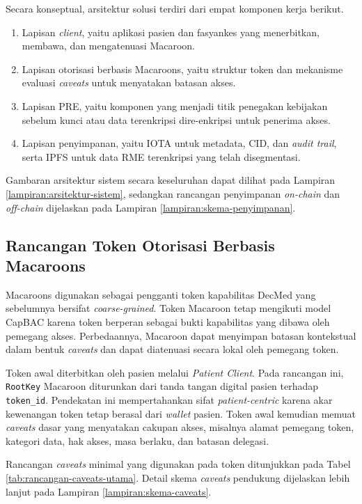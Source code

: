 Secara konseptual, arsitektur solusi terdiri dari empat komponen kerja berikut.

\begin{enumerate}[leftmargin=*]
	\item Lapisan \textit{client}, yaitu aplikasi pasien dan fasyankes yang menerbitkan, membawa, dan mengatenuasi Macaroon.
	\item Lapisan otorisasi berbasis Macaroons, yaitu struktur token dan mekanisme evaluasi \textit{caveats} untuk menyatakan batasan akses.
	\item Lapisan PRE, yaitu komponen yang menjadi titik penegakan kebijakan sebelum kunci atau data terenkripsi dire-enkripsi untuk penerima akses.
	\item Lapisan penyimpanan, yaitu IOTA untuk metadata, CID, dan \textit{audit trail}, serta IPFS untuk data RME terenkripsi yang telah disegmentasi.
\end{enumerate}

Gambaran arsitektur sistem secara keseluruhan dapat dilihat pada Lampiran \ref{lampiran:arsitektur-sistem}, sedangkan rancangan penyimpanan \textit{on-chain} dan \textit{off-chain} dijelaskan pada Lampiran \ref{lampiran:skema-penyimpanan}.

\subsection{Rancangan Token Otorisasi Berbasis Macaroons}
\label{subsec:rancangan-token-macaroons}

Macaroons digunakan sebagai pengganti token kapabilitas DecMed yang sebelumnya bersifat \textit{coarse-grained}. Token Macaroon tetap mengikuti model CapBAC karena token berperan sebagai bukti kapabilitas yang dibawa oleh pemegang akses. Perbedaannya, Macaroon dapat menyimpan batasan kontekstual dalam bentuk \textit{caveats} dan dapat diatenuasi secara lokal oleh pemegang token.

Token awal diterbitkan oleh pasien melalui \textit{Patient Client}. Pada rancangan ini, \texttt{RootKey} Macaroon diturunkan dari tanda tangan digital pasien terhadap \texttt{token\_id}. Pendekatan ini mempertahankan sifat \textit{patient-centric} karena akar kewenangan token tetap berasal dari \textit{wallet} pasien. Token awal kemudian memuat \textit{caveats} dasar yang menyatakan cakupan akses, misalnya alamat pemegang token, kategori data, hak akses, masa berlaku, dan batasan delegasi.

Rancangan \textit{caveats} minimal yang digunakan pada token ditunjukkan pada Tabel \ref{tab:rancangan-caveats-utama}. Detail skema \textit{caveats} pendukung dijelaskan lebih lanjut pada Lampiran \ref{lampiran:skema-caveats}.


